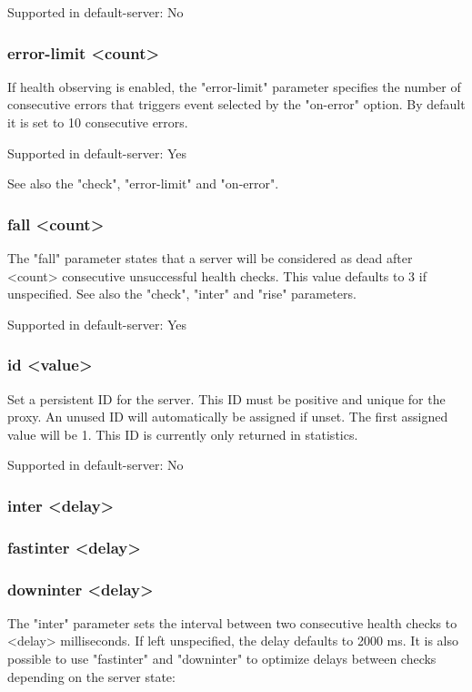   Supported in default-server: No

\subsubsection[error-limit]{error-limit <count>}
  If health observing is enabled, the "error-limit" parameter specifies the
  number of consecutive errors that triggers event selected by the "on-error"
  option. By default it is set to 10 consecutive errors.

  Supported in default-server: Yes

  See also the "check", "error-limit" and "on-error".

\subsubsection[fall]{fall <count>}
  The "fall" parameter states that a server will be considered as dead after
  <count> consecutive unsuccessful health checks. This value defaults to 3 if
  unspecified. See also the "check", "inter" and "rise" parameters.

  Supported in default-server: Yes

\subsubsection[id]{id <value>}
  Set a persistent ID for the server. This ID must be positive and unique for
  the proxy. An unused ID will automatically be assigned if unset. The first
  assigned value will be 1. This ID is currently only returned in statistics.

  Supported in default-server: No

\subsubsection[inter]{inter <delay>}
\subsubsection[fastinter]{fastinter <delay>}
\subsubsection[downinter]{downinter <delay>}
  The "inter" parameter sets the interval between two consecutive health checks
  to <delay> milliseconds. If left unspecified, the delay defaults to 2000 ms.
  It is also possible to use "fastinter" and "downinter" to optimize delays
  between checks depending on the server state:

